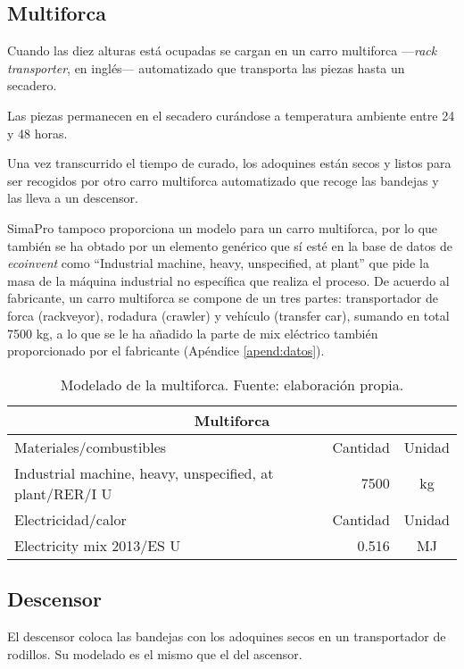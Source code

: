 \subsection{Multiforca}
Cuando las diez alturas está ocupadas se cargan en un carro multiforca —\textit{rack transporter}, en inglés— automatizado que transporta las piezas hasta un secadero.

Las piezas permanecen en el secadero curándose a temperatura ambiente entre 24 y 48 horas.

Una vez transcurrido el tiempo de curado, los adoquines están secos y listos para ser recogidos por otro carro multiforca automatizado que recoge las bandejas y las lleva a un descensor.

SimaPro tampoco proporciona un modelo para un carro multiforca, por lo que también se ha obtado por un elemento genérico que sí esté en la base de datos de \textit{ecoinvent} como ``Industrial machine, heavy, unspecified, at plant'' que pide la masa de la máquina industrial no específica que realiza el proceso. De acuerdo al fabricante, un carro multiforca se compone de un tres partes: transportador de forca (rackveyor), rodadura (crawler) y vehículo (transfer car), sumando en total 7500 \si{kg}, a lo que se le ha añadido la parte de mix eléctrico también proporcionado por el fabricante (Apéndice \ref{apend:datos}).

\begin{table}[!htb]
\centering
\begin{tabular}{p{8cm}rc}
\toprule
\multicolumn{3}{c}{Multiforca}\\
\midrule
Materiales/combustibles & Cantidad & Unidad\\
\midrule
Industrial machine, heavy, unspecified, at plant/RER/I U & 7500 & \si{kg}\\
\midrule
Electricidad/calor & Cantidad & Unidad\\
\midrule
Electricity mix 2013/ES U & 0.516 & \si{MJ}\\
\bottomrule
\end{tabular}
\caption[Modelado de la multiforca.]{Modelado de la multiforca. Fuente: elaboración propia.}
\label{modeladomultiforca}
\end{table}

\subsection{Descensor}
El descensor coloca las bandejas con los adoquines secos en un transportador de rodillos. Su modelado es el mismo que el del ascensor.

